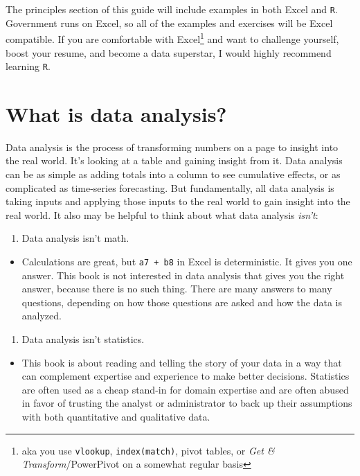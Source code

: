 \documentclass[]{book}
\providecommand{\tightlist}{%
  \setlength{\itemsep}{0pt}\setlength{\parskip}{0pt}}
\begin{document}
The principles section of this guide will include examples in both Excel and \texttt{R}. Government runs on Excel, so all of the examples and exercises will be Excel compatible. If you are comfortable with Excel\footnote{aka you use \texttt{vlookup}, \texttt{index(match)}, pivot tables, or \emph{Get \& Transform}/PowerPivot on a somewhat regular basis} and want to challenge yourself, boost your resume, and become a data superstar, I would highly recommend learning \texttt{R}.

\hypertarget{what-is-data-analysis}{%
\section{What is data analysis?}\label{what-is-data-analysis}}

Data analysis is the process of transforming numbers on a page to insight into the real world. It's looking at a table and gaining insight from it. Data analysis can be as simple as adding totals into a column to see cumulative effects, or as complicated as time-series forecasting. But fundamentally, all data analysis is taking inputs and applying those inputs to the real world to gain insight into the real world. It also may be helpful to think about what data analysis \emph{isn't}:

\begin{enumerate}
\def\labelenumi{\arabic{enumi}.}
\tightlist
\item
  Data analysis isn't math.
\end{enumerate}

\begin{itemize}
\tightlist
\item
  Calculations are great, but \texttt{a7\ +\ b8} in Excel is deterministic. It gives you one answer. This book is not interested in data analysis that gives you the right answer, because there is no such thing. There are many answers to many questions, depending on how those questions are asked and how the data is analyzed.
\end{itemize}

\begin{enumerate}
\def\labelenumi{\arabic{enumi}.}
\setcounter{enumi}{1}
\tightlist
\item
  Data analysis isn't statistics.
\end{enumerate}

\begin{itemize}
\tightlist
\item
  This book is about reading and telling the story of your data in a way that can complement expertise and experience to make better decisions. Statistics are often used as a cheap stand-in for domain expertise and are often abused in favor of trusting the analyst or administrator to back up their assumptions with both quantitative and qualitative data.
\end{itemize}
\end{document}
